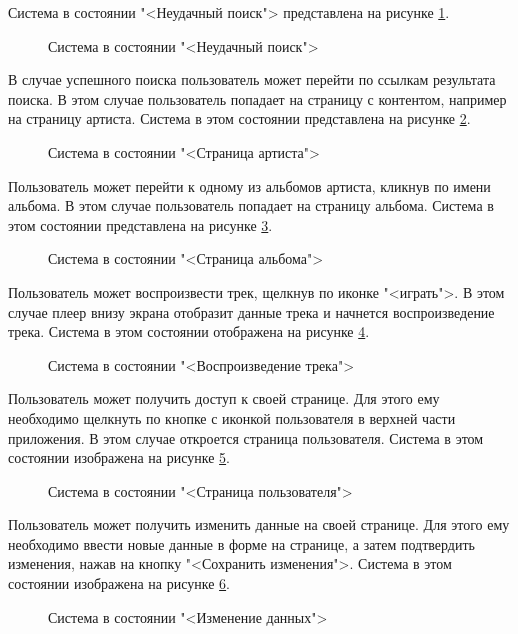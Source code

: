 Система в состоянии "<Неудачный поиск"> представлена на рисунке \ref{stestSearchFail:image}.
\begin{figure}[H]
	\caption{Система в состоянии "<Неудачный поиск">}
	\label{stestSearchFail:image}
\end{figure}
В случае успешного поиска пользователь может перейти по ссылкам результата поиска. В этом случае пользователь попадает на страницу с контентом, например на страницу артиста. Система в этом состоянии представлена на рисунке \ref{stestArtist:image}.
\begin{figure}[H]
	\caption{Система в состоянии "<Страница артиста">}
	\label{stestArtist:image}
\end{figure}
Пользователь может перейти к одному из альбомов артиста, кликнув по имени альбома. В этом случае пользователь попадает на страницу альбома. Система в этом состоянии представлена на рисунке \ref{stestAlbum:image}.
\begin{figure}[H]
	\caption{Система в состоянии "<Страница альбома">}
	\label{stestAlbum:image}
\end{figure}
Пользователь может воспроизвести трек, щелкнув по иконке "<играть">. В этом случае плеер внизу экрана отобразит данные трека и начнется воспроизведение трека. Система в этом состоянии отображена на рисунке \ref{stestPlayer:image}.
\begin{figure}[H]
	\caption{Система в состоянии "<Воспроизведение  трека">}
	\label{stestPlayer:image}
\end{figure}
Пользователь может получить доступ к своей странице. Для этого ему необходимо щелкнуть по кнопке с иконкой пользователя в верхней части приложения. В этом случае откроется страница пользователя. Система в этом состоянии изображена на рисунке \ref{stestUserBefore:image}.
\begin{figure}[H]
	\caption{Система в состоянии "<Страница пользователя">}
	\label{stestUserBefore:image}
\end{figure}
Пользователь может получить изменить данные на своей странице. Для этого ему необходимо ввести новые данные в форме на странице, а затем подтвердить изменения, нажав на кнопку "<Сохранить изменения">. Система в этом состоянии изображена на рисунке \ref{stestUserAfter:image}.
\begin{figure}[H]
	\caption{Система в состоянии "<Изменение данных">}
	\label{stestUserAfter:image}
\end{figure}
\clearpage